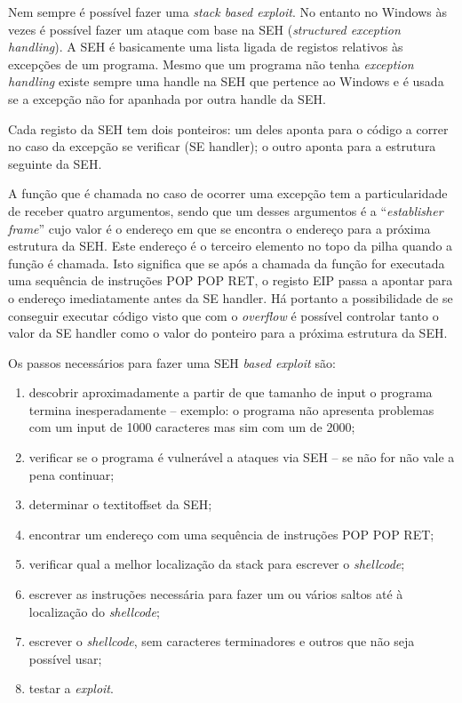 \documentclass[a4paper]{article}
\begin{document}
Nem sempre é possível fazer uma \textit{stack based exploit}. No entanto no Windows às vezes é possível fazer um ataque com base na SEH (\textit{structured exception handling}). A SEH é basicamente uma lista ligada de registos relativos às excepções de um programa. Mesmo que um programa não tenha \textit{exception handling} existe sempre uma handle na SEH que pertence ao Windows e é usada se a excepção não for apanhada por outra handle da SEH.

Cada registo da SEH tem dois ponteiros: um deles aponta para o código a correr no caso da excepção se verificar (SE handler); o outro aponta para a estrutura seguinte da SEH.

A função que é chamada no caso de ocorrer uma excepção tem a particularidade de receber quatro argumentos, sendo que um desses argumentos é a ``\textit{establisher frame}'' cujo valor é o endereço em que se encontra o endereço para a próxima estrutura da SEH. Este endereço é o terceiro elemento no topo da pilha quando a função é chamada. Isto significa que se após a chamada da função for executada uma sequência de instruções POP POP RET, o registo EIP passa a apontar para o endereço imediatamente antes da SE handler. Há portanto a possibilidade de se conseguir executar código visto que com o \textit{overflow} é possível controlar tanto o valor da SE handler como o valor do ponteiro para a próxima estrutura da SEH.

Os passos necessários para fazer uma SEH \textit{based exploit} são:

\begin{enumerate}
	\item descobrir aproximadamente a partir de que tamanho de input o programa termina inesperadamente -- exemplo: o programa não apresenta problemas com um input de 1000 caracteres mas sim com um de 2000;
	\item verificar se o programa é vulnerável a ataques via SEH -- se não for não vale a pena continuar;
	\item determinar o textit{offset} da SEH;
	\item encontrar um endereço com uma sequência de instruções POP POP RET;
	\item verificar qual a melhor localização da stack para escrever o \textit{shellcode};
	\item escrever as instruções necessária para fazer um ou vários saltos até à localização do \textit{shellcode};
	\item escrever o \textit{shellcode}, sem caracteres terminadores e outros que não seja possível usar;
	\item testar a \textit{exploit}.
\end{enumerate}
\end{document}
